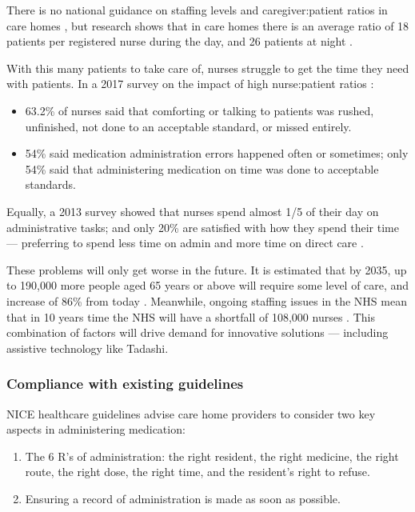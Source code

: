 \documentclass{article}
\begin{document}
There is no national guidance on staffing levels and caregiver:patient ratios in care homes \cite{rcnstaffingadvice}, but research shows that in care homes there is an average ratio of 18 patients per registered nurse during the day, and 26 patients at night \cite{rcnstaffingguidance}.

With this many patients to take care of, nurses struggle to get the time they need with patients. In a 2017 survey on the impact of high nurse:patient ratios \cite{unison}:
\begin{itemize}
\item 63.2\% of nurses said that comforting or talking to patients was rushed, unfinished, not done to an acceptable standard, or missed entirely. 
\item 54\% said medication administration errors happened often or sometimes; only 54\% said that administering medication on time was done to acceptable standards.
\end{itemize}

Equally, a 2013 survey showed that nurses spend almost 1/5 of their day on administrative tasks; and only 20\% are satisfied with how they spend their time --- preferring to spend less time on admin and more time on direct care \cite{rcnpol}.

These problems will only get worse in the future. It is estimated that by 2035, up to 190,000 more people aged 65 years or above will require some level of care, and increase of 86\% from today \cite{lancet}. Meanwhile, ongoing staffing issues in the NHS mean that in 10 years time the NHS will have a shortfall of 108,000 nurses \cite{nuffield}. This combination of factors will drive demand for innovative solutions --- including assistive technology like Tadashi. 

\subsubsection{Compliance with existing guidelines}
NICE healthcare guidelines \cite{niceguidance} advise care home providers to consider two key aspects in administering medication:
\begin{enumerate}
\item The 6 R's of administration: the right resident, the right medicine, the right route, the right dose, the right time, and the resident's right to refuse. 
\item Ensuring a record of administration is made as soon as possible. 
\end{enumerate}
\end{document}
